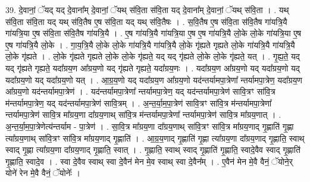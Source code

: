 \documentclass[17pt]{extarticle}
\begin{document}
39. दे॒वानां॒ ॅयद् यद् दे॒वाना᳚म् दे॒वानां॒ ॅयथ् स॑वि॒ता स॑वि॒ता यद् दे॒वाना᳚म् दे॒वानां॒ ॅयथ् स॑वि॒ता । . यथ् स॑वि॒ता स॑वि॒ता यद् यथ् स॑वि॒तैष ए॒ष स॑वि॒ता यद् यथ् स॑वि॒तैषः । . स॒वि॒तैष ए॒ष स॑वि॒ता स॑वि॒तैष गा॑यत्रि॒यै गा॑यत्रि॒या ए॒ष स॑वि॒ता स॑वि॒तैष गा॑यत्रि॒यै । . ए॒ष गा॑यत्रि॒यै गा॑यत्रि॒या ए॒ष ए॒ष गा॑यत्रि॒यै लो॒के लो॒के गा॑यत्रि॒या ए॒ष ए॒ष गा॑यत्रि॒यै लो॒के । . गा॒य॒त्रि॒यै लो॒के लो॒के गा॑यत्रि॒यै गा॑यत्रि॒यै लो॒के गृ॑ह्यते गृह्यते लो॒के गा॑यत्रि॒यै गा॑यत्रि॒यै लो॒के गृ॑ह्यते । . लो॒के गृ॑ह्यते गृह्यते लो॒के लो॒के गृ॑ह्यते॒ यद् यद् गृ॑ह्यते लो॒के लो॒के गृ॑ह्यते॒ यत् । . गृ॒ह्य॒ते॒ यद् यद् गृ॑ह्यते गृह्यते॒ यदा᳚ग्रय॒ण आ᳚ग्रय॒णो यद् गृ॑ह्यते गृह्यते॒ यदा᳚ग्रय॒णः । . यदा᳚ग्रय॒ण आ᳚ग्रय॒णो यद् यदा᳚ग्रय॒णो यद् यदा᳚ग्रय॒णो यद् यदा᳚ग्रय॒णो यत् । . आ॒ग्र॒य॒णो यद् यदा᳚ग्रय॒ण आ᳚ग्रय॒णो यद॑न्तर्यामपा॒त्रेणा᳚ न्तर्यामपा॒त्रेण॒ यदा᳚ग्रय॒ण आ᳚ग्रय॒णो यद॑न्तर्यामपा॒त्रेण॑ । . यद॑न्तर्यामपा॒त्रेणा᳚ न्तर्यामपा॒त्रेण॒ यद् यद॑न्तर्यामपा॒त्रेण॑ सावि॒त्रꣳ सा॑वि॒त्र म॑न्तर्यामपा॒त्रेण॒ यद् यद॑न्तर्यामपा॒त्रेण॑ सावि॒त्रम् । . अ॒न्त॒र्या॒म॒पा॒त्रेण॑ सावि॒त्रꣳ सा॑वि॒त्र म॑न्तर्यामपा॒त्रेणा᳚ न्तर्यामपा॒त्रेण॑ सावि॒त्र मा᳚ग्रय॒णा दा᳚ग्रय॒णाथ् सा॑वि॒त्र म॑न्तर्यामपा॒त्रेणा᳚ न्तर्यामपा॒त्रेण॑ सावि॒त्र मा᳚ग्रय॒णात् । . अ॒न्त॒र्या॒म॒पा॒त्रेणेत्य॑न्तर्याम - पा॒त्रेण॑ । . सा॒वि॒त्र मा᳚ग्रय॒णा दा᳚ग्रय॒णाथ् सा॑वि॒त्रꣳ सा॑वि॒त्र मा᳚ग्रय॒णाद् गृ॒ह्णाति॑ गृ॒ह्णा त्या᳚ग्रय॒णाथ् सा॑वि॒त्रꣳ सा॑वि॒त्र मा᳚ग्रय॒णाद् गृ॒ह्णाति॑ । . आ॒ग्र॒य॒णाद् गृ॒ह्णाति॑ गृ॒ह्णा त्या᳚ग्रय॒णा दा᳚ग्रय॒णाद् गृ॒ह्णाति॒ स्वाथ् स्वाद् गृ॒ह्णा त्या᳚ग्रय॒णा
दा᳚ग्रय॒णाद् गृ॒ह्णाति॒ स्वात् । . गृ॒ह्णाति॒ स्वाथ् स्वाद् गृ॒ह्णाति॑ गृ॒ह्णाति॒ स्वादे॒वैव स्वाद् गृ॒ह्णाति॑ गृ॒ह्णाति॒ स्वादे॒व । . स्वा दे॒वैव स्वाथ् स्वा दे॒वैन॑ मेन मे॒व स्वाथ् स्वा दे॒वैन᳚म् । . ए॒वैन॑ मेन मे॒वै वैनं॒ ॅयोने॒र् योने॑ रेन मे॒वै वैनं॒ ॅयोनेः᳚ । \newline
\end{document}

